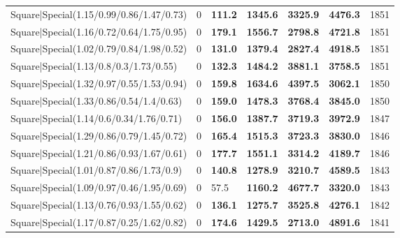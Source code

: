 \begin{tabular}{lrllllr}
 Square|Special(1.15/0.99/0.86/1.47/0.73)                      &             0   & \textbf{111.2} & \textbf{1345.6} & \textbf{3325.9} & \textbf{4476.3} &         1851 \\
 Square|Special(1.16/0.72/0.64/1.75/0.95)                      &             0   & \textbf{179.1} & \textbf{1556.7} & \textbf{2798.8} & \textbf{4721.8} &         1851 \\
 Square|Special(1.02/0.79/0.84/1.98/0.52)                      &             0   & \textbf{131.0} & \textbf{1379.4} & \textbf{2827.4} & \textbf{4918.5} &         1851 \\
 Square|Special(1.13/0.8/0.3/1.73/0.55)                        &             0   & \textbf{132.3} & \textbf{1484.2} & \textbf{3881.1} & \textbf{3758.5} &         1851 \\
 Square|Special(1.32/0.97/0.55/1.53/0.94)                      &             0   & \textbf{159.8} & \textbf{1634.6} & \textbf{4397.5} & \textbf{3062.1} &         1850 \\
 Square|Special(1.33/0.86/0.54/1.4/0.63)                       &             0   & \textbf{159.0} & \textbf{1478.3} & \textbf{3768.4} & \textbf{3845.0} &         1850 \\
 Square|Special(1.14/0.6/0.34/1.76/0.71)                       &             0   & \textbf{156.0} & \textbf{1387.7} & \textbf{3719.3} & \textbf{3972.9} &         1847 \\
 Square|Special(1.29/0.86/0.79/1.45/0.72)                      &             0   & \textbf{165.4} & \textbf{1515.3} & \textbf{3723.3} & \textbf{3830.0} &         1846 \\
 Square|Special(1.21/0.86/0.93/1.67/0.61)                      &             0   & \textbf{177.7} & \textbf{1551.1} & \textbf{3314.2} & \textbf{4189.7} &         1846 \\
 Square|Special(1.01/0.87/0.86/1.73/0.9)                       &             0   & \textbf{140.8} & \textbf{1278.9} & \textbf{3210.7} & \textbf{4589.5} &         1843 \\
 Square|Special(1.09/0.97/0.46/1.95/0.69)                      &             0   & 57.5           & \textbf{1160.2} & \textbf{4677.7} & \textbf{3320.0} &         1843 \\
 Square|Special(1.13/0.76/0.93/1.55/0.62)                      &             0   & \textbf{136.1} & \textbf{1275.7} & \textbf{3525.8} & \textbf{4276.1} &         1842 \\
 Square|Special(1.17/0.87/0.25/1.62/0.82)                      &             0   & \textbf{174.6} & \textbf{1429.5} & \textbf{2713.0} & \textbf{4891.6} &         1841 \\

\end{tabular}
